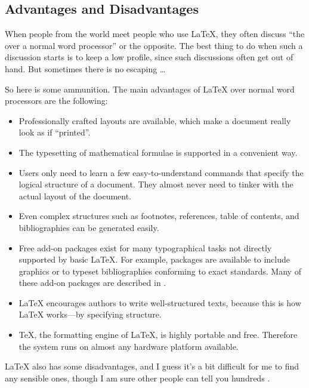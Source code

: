 \subsection{Advantages and Disadvantages}

When people from the  world meet people who use \LaTeX{},
they often discuss \enquote{the  over a normal
  word processor} or the opposite.  The best thing to do when such
a discussion starts is to keep a low profile, since such discussions
often get out of hand. But sometimes there is no escaping \ldots

\medskip\noindent So here is some ammunition. The main advantages
of \LaTeX{} over normal word processors are the following:

\begin{itemize}

  \item Professionally crafted layouts are available, which make a
        document really look as if \enquote{printed}.
  \item The typesetting of mathematical formulae is supported in a
        convenient way.
  \item Users only need to learn a few easy-to-understand commands
        that specify the logical structure of a document. They almost never
        need to tinker with the actual layout of the document.
  \item Even complex structures such as footnotes, references, table of
        contents, and bibliographies can be generated easily.
  \item Free add-on packages exist for many typographical tasks not directly
        supported by basic \LaTeX. For example, packages are available to
        include \PSi{} graphics or to typeset bibliographies conforming to
        exact standards. Many of these add-on packages are described in
        \companion.
  \item \LaTeX{} encourages authors to write well-structured texts,
        because this is how \LaTeX{} works---by specifying structure.
  \item \TeX, the formatting engine of \LaTeX, is highly portable and free.
        Therefore the system runs on almost any hardware platform
        available.

\end{itemize}

\medskip

\noindent\LaTeX{} also has some disadvantages, and I guess it's a bit
difficult for me to find any sensible ones, though I am sure other people
can tell you hundreds \smiley.

